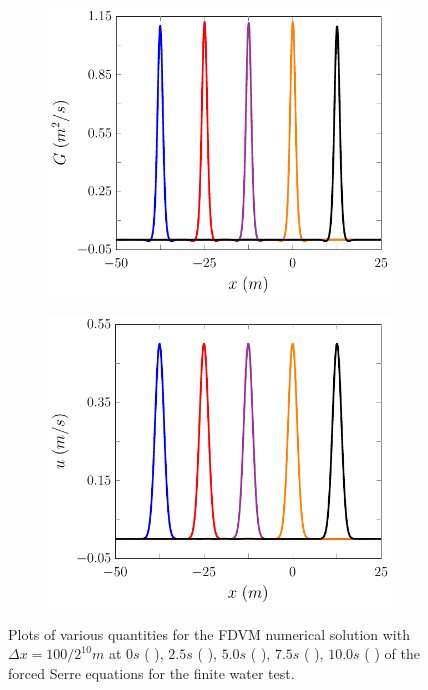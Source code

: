 \begin{figure}
\begin{subfigure}{0.5\textwidth}
		\vspace{0.5cm}
	\end{subfigure}
	\begin{subfigure}{0.5\textwidth}
		\includegraphics[width=\textwidth]{./chp5/figures/Forced/Wet/FDVMG.pdf}
		\vspace{0.5cm}
	\end{subfigure}%
	\begin{subfigure}{0.5\textwidth}
		\includegraphics[width=\textwidth]{./chp5/figures/Forced/Wet/FDVMu.pdf}
		\vspace{0.5cm}
	\end{subfigure}
	\caption{Plots of various quantities for the FDVM numerical solution with $\Delta x = 100/ 2^{10} m$ at $0s$ ({\color{blue} \solidrule}), $2.5s$ ({\color{red} \solidrule}), $5.0s$ ({\color{violet!80!white} \solidrule}), $7.5s$ ({\color{orange} \solidrule}), $10.0s$ ({\color{black} \solidrule}) of the forced Serre equations for the finite water test.}
	\label{fig:ForcedWetFDVMP2PExAll}
\end{figure}


